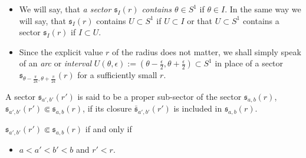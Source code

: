 \begin{rem}
  \begin{itemize}
    \item We will say, that \emph{a sector $\mathfrak{s}_{I}(r)$ contains
      $\theta\in S^1$} if $\theta\in I$. In the same way we will say, that
      $\mathfrak{s}_I(r)$ contains $U\subset S^1$ if $U\subset I$ or that
      $U\subset S^1$ contains a sector $\mathfrak{s}_I(r)$ if $I\subset U$.
    \item Since the explicit value $r$ of the radius does not matter, we shall
      simply speak of an \emph{arc} or \emph{interval}
      $U(\theta,\epsilon):=\left(\theta-\frac{\epsilon}{2}
      ,\theta+\frac{\epsilon}{2}\right)\subset S^1$ in place of a sector
      $\mathfrak{s}_{\theta-\frac{\pi}{2k},\theta+\frac{\pi}{2k}}(r)$ for a
      sufficiently small $r$. 
  \end{itemize}
\end{rem}
\begin{defn}
  A sector $\mathfrak{s}_{a',b'}(r')$ is said to be a proper sub-sector of the
  sector $\mathfrak{s}_{a,b}(r)$,
  $\mathfrak{s}_{a',b'}(r')\Subset\mathfrak{s}_{a,b}(r)$, if its closure
  $\bar{\mathfrak{s}}_{a',b'}(r')$ is included in $\mathfrak{s}_{a,b}(r)$.
  \begin{rem}
    $\mathfrak{s}_{a',b'}(r')\Subset\mathfrak{s}_{a,b}(r)$ if and only if
    \begin{itemize}
      \item $a<a'<b'<b$ and $r'<r$.
    \end{itemize}
  \end{rem}
\end{defn}

